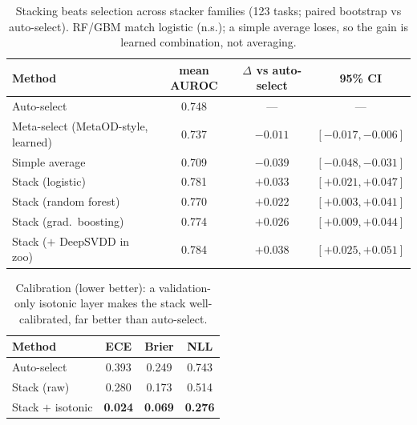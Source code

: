 \documentclass[11pt,titlepage]{article}
\begin{document}
\begin{table}[H]\centering
\caption{Stacking beats selection across stacker families (123 tasks; paired
bootstrap vs auto-select). RF/GBM match logistic (n.s.); a simple average loses,
so the gain is learned combination, not averaging.}
\label{tab:stackers_th}\small
\begin{tabular}{lccc}
\toprule
\textbf{Method} & mean AUROC & $\Delta$ vs auto-select & 95\% CI \\
\midrule
Auto-select & 0.748 & --- & --- \\
Meta-select (MetaOD-style, learned) & 0.737 & $-0.011$ & $[-0.017,-0.006]$ \\
Simple average & 0.709 & $-0.039$ & $[-0.048,-0.031]$ \\
Stack (logistic) & 0.781 & $+0.033$ & $[+0.021,+0.047]$ \\
Stack (random forest) & 0.770 & $+0.022$ & $[+0.003,+0.041]$ \\
Stack (grad.\ boosting) & 0.774 & $+0.026$ & $[+0.009,+0.044]$ \\
Stack ($+$ DeepSVDD in zoo) & 0.784 & $+0.038$ & $[+0.025,+0.051]$ \\
\bottomrule
\end{tabular}
\end{table}

\begin{table}[H]\centering
\caption{Calibration (lower better): a validation-only isotonic layer makes the
stack well-calibrated, far better than auto-select.}
\label{tab:calib_th}\small
\begin{tabular}{lccc}
\toprule
\textbf{Method} & ECE & Brier & NLL \\
\midrule
Auto-select & 0.393 & 0.249 & 0.743 \\
Stack (raw) & 0.280 & 0.173 & 0.514 \\
Stack $+$ isotonic & \textbf{0.024} & \textbf{0.069} & \textbf{0.276} \\
\bottomrule
\end{tabular}
\end{table}
\end{document}
